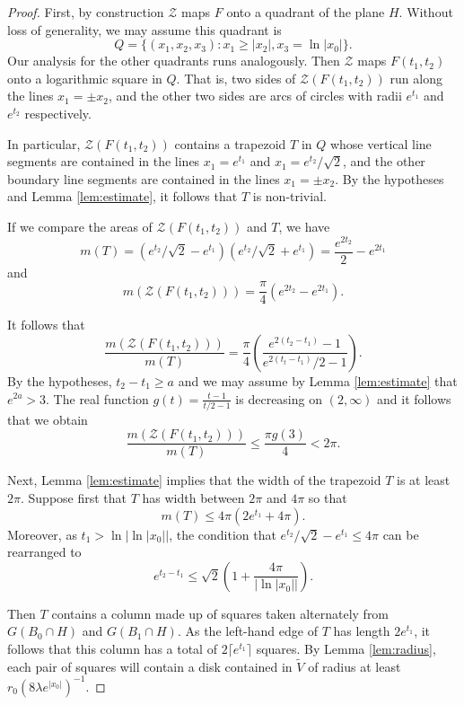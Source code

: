 \documentclass[10pt,a4paper]{amsart}
\begin{document}
\begin{proof}
First, by construction $\mathcal{Z}$ maps $F$ onto a quadrant of the plane $H$. Without loss of generality, we may assume this quadrant is
\[ Q = \{ (x_1,x_2,x_3) : x_1 \geq |x_2|, x_3 = \ln |x_0| \}.\]
Our analysis for the other quadrants runs analogously. Then $\mathcal{Z}$ maps $F(t_1,t_2)$ onto a logarithmic square in $Q$. That is, two sides of $\mathcal{Z} ( F(t_1,t_2))$ run along the lines $x_1 = \pm x_2$, and the other two sides are arcs of circles with radii $e^{t_1}$ and $e^{t_2}$ respectively.

In particular, $\mathcal{Z} ( F(t_1,t_2))$ contains a trapezoid $T$ in $Q$ whose vertical line segments are contained in the lines $x_1 = e^{t_1}$ and $x_1 = e^{t_2}/\sqrt{2}$, and the other boundary line segments are contained in the lines $x_1 = \pm x_2$. By the hypotheses and Lemma \ref{lem:estimate}, it follows that $T$ is non-trivial. 

If we compare the areas of $\mathcal{Z} ( F(t_1,t_2))$ and $T$, we have
\[ m(T) = (e^{t_2}/\sqrt{2} - e^{t_1})(e^{t_2}/\sqrt{2} + e^{t_1}) = \frac{e^{2t_2}}{2} - e^{2t_1} \]
and
\[ m(\mathcal{Z} ( F(t_1,t_2))) = \frac{\pi}{4} (  e^{2t_2} - e^{2t_1}) .\]

It follows that
\[ \frac{  m(\mathcal{Z}( F(t_1,t_2) ) )}{m(T)} = \frac{\pi}{4} \left ( \frac{e^{2(t_2-t_1)} -1}{e^{2(t_t-t_1)}/2 -1} \right ). \]
By the hypotheses, $t_2-t_1\geq a$ and we may assume by Lemma \ref{lem:estimate} that $e^{2a}>3$. The real function $g(t) = \frac{t-1}{t/2-1}$ is decreasing on $(2,\infty)$ and it follows that we obtain
\begin{equation}
    \label{eq:double1}
\frac{  m(\mathcal{Z}( F(t_1,t_2) ) )}{m(T)} \leq \frac{\pi g(3)}{4} < 2\pi.
\end{equation}

Next, Lemma \ref{lem:estimate} implies that the width of the trapezoid $T$ is at least $2\pi$.
Suppose first that $T$ has width between $2\pi$ and $4\pi$ so that 
\begin{equation}
    \label{eq:Tsize}
    m(T) \leq 4\pi(2e^{t_1} + 4\pi).
\end{equation} 
Moreover, as $t_1>\ln | \ln|x_0||$, the condition that $e^{t_2}/\sqrt{2} - e^{t_1} \leq 4\pi$ can be rearranged to
\begin{equation}
    \label{eq:double2}
e^{t_2-t_1} \leq \sqrt{2}\left( 1+\frac{4\pi}{|\ln |x_0||}\right ).
\end{equation}

Then $T$ contains a column made up of squares taken alternately from $G(B_0 \cap H)$ and $G(B_1 \cap H)$. As the left-hand edge of $T$ has length $2e^{t_1}$, it follows that this column has a total of $2\lceil e^{t_1} \rceil$ squares. By Lemma \ref{lem:radius}, each pair of squares will contain a disk contained in $\widetilde{V}$ of radius at least $r_0(8\lambda e^{|x_0|})^{-1}$.


\end{proof}
\end{document}
